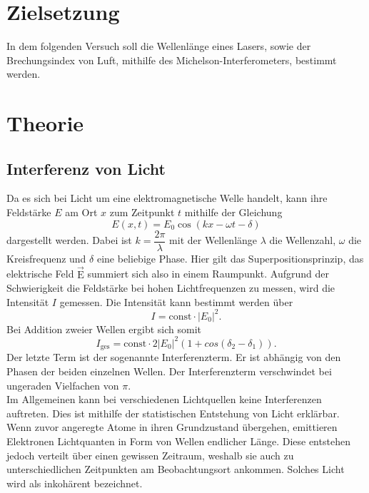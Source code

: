 \section{Zielsetzung}
In dem folgenden Versuch soll die Wellenlänge eines Lasers, sowie der Brechungsindex von Luft, mithilfe des Michelson-Interferometers, bestimmt werden.

\section{Theorie}
\label{sec:Theorie}

\subsection{Interferenz von Licht}

Da es sich bei Licht um eine elektromagnetische Welle handelt, kann ihre Feldstärke $E$ am Ort $x$ zum Zeitpunkt $t$ mithilfe der Gleichung
\begin{equation}
    \label{eq:1}
    E(x,t) = E_0 \cos(kx - \omega t - \delta)
\end{equation}
dargestellt werden. Dabei ist $k = \dfrac{2\pi}{\lambda}$ mit der Wellenlänge $\lambda$ die Wellenzahl, $\omega$ die Kreisfrequenz und $\delta$ eine beliebige Phase. Hier gilt das Superpositionsprinzip, das elektrische Feld $\overrightarrow{\text{E}}$ summiert sich also in einem Raumpunkt. Aufgrund der Schwierigkeit die Feldstärke bei hohen Lichtfrequenzen zu messen, wird die Intensität $I$ gemessen. 
Die Intensität kann bestimmt werden über
\begin{equation}
\label{eq:2}
	I = \text{const} \cdot |E_0|^2 .
\end{equation}
Bei Addition zweier Wellen ergibt sich somit
\begin{equation}
\label{eq:3}
    I_\text{ges} = \text{const} \cdot 2 |E_0|^2 (1 + cos(\delta_2 - \delta_1)).
\end{equation}
Der letzte Term ist der sogenannte Interferenzterm. Er ist abhängig von den Phasen der beiden einzelnen Wellen. Der Interferenzterm verschwindet bei ungeraden Vielfachen von $\pi$. 
\\
Im Allgemeinen kann bei verschiedenen Lichtquellen keine Interferenzen auftreten. Dies ist mithilfe der statistischen Entstehung von Licht erklärbar. Wenn zuvor angeregte Atome in ihren Grundzustand übergehen, emittieren Elektronen Lichtquanten in Form von Wellen endlicher Länge. Diese entstehen jedoch verteilt über einen gewissen Zeitraum, weshalb sie auch zu unterschiedlichen Zeitpunkten am Beobachtungsort ankommen. Solches Licht wird als inkohärent bezeichnet. \newline
